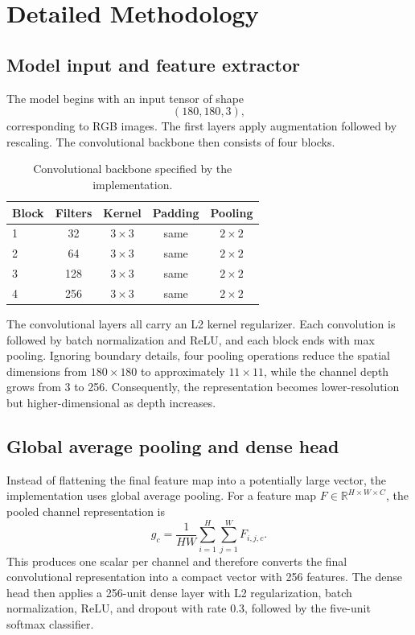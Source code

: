 \documentclass[11pt,a4paper]{article}
\begin{document}
\section{Detailed Methodology}
\subsection{Model input and feature extractor}
The model begins with an input tensor of shape
\begin{equation}
(180,180,3),
\end{equation}
corresponding to RGB images. The first layers apply augmentation followed by rescaling. The convolutional backbone then consists of four blocks.

\begin{table}[ht]
\centering
\small
\begin{tabular}{lcccc}
\toprule
Block & Filters & Kernel & Padding & Pooling \\
\midrule
1 & 32 & $3\times3$ & same & $2\times2$ \\
2 & 64 & $3\times3$ & same & $2\times2$ \\
3 & 128 & $3\times3$ & same & $2\times2$ \\
4 & 256 & $3\times3$ & same & $2\times2$ \\
\bottomrule
\end{tabular}
\caption{Convolutional backbone specified by the implementation.}
\end{table}

The convolutional layers all carry an L2 kernel regularizer. Each convolution is followed by batch normalization and ReLU, and each block ends with max pooling. Ignoring boundary details, four pooling operations reduce the spatial dimensions from $180\times180$ to approximately $11\times11$, while the channel depth grows from 3 to 256. Consequently, the representation becomes lower-resolution but higher-dimensional as depth increases.

\subsection{Global average pooling and dense head}
Instead of flattening the final feature map into a potentially large vector, the implementation uses global average pooling. For a feature map $F\in\mathbb{R}^{H\times W\times C}$, the pooled channel representation is
\begin{equation}
g_c = \frac{1}{HW}\sum_{i=1}^{H}\sum_{j=1}^{W} F_{i,j,c}.
\end{equation}
This produces one scalar per channel and therefore converts the final convolutional representation into a compact vector with 256 features. The dense head then applies a 256-unit dense layer with L2 regularization, batch normalization, ReLU, and dropout with rate 0.3, followed by the five-unit softmax classifier.
\end{document}
